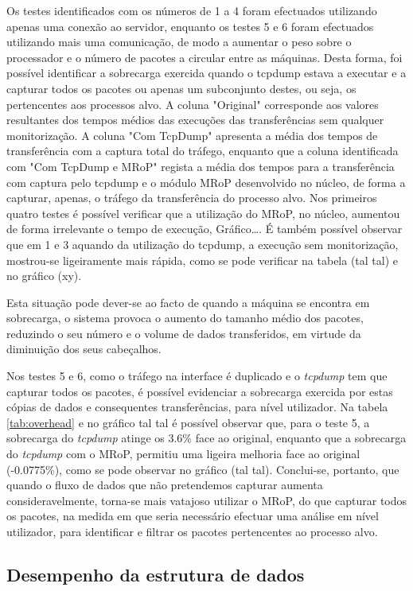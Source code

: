 Os testes identificados com os números de 1 a 4 foram efectuados utilizando apenas uma conexão ao servidor, enquanto os testes 5 e 6 foram efectuados utilizando mais uma comunicação, de modo a aumentar o peso sobre o processador e o número de pacotes a circular entre as máquinas.
Desta forma, foi possível identificar a sobrecarga exercida quando o tcpdump estava a executar e a capturar todos os pacotes ou apenas um subconjunto destes, ou seja, os pertencentes aos processos alvo.
A coluna "Original" corresponde aos valores resultantes dos tempos médios das execuções das transferências sem qualquer monitorização.
A coluna "Com TcpDump" apresenta a média dos tempos de transferência com a captura total do tráfego, enquanto que a coluna identificada com "Com TcpDump e MRoP" regista a média dos tempos para a transferência com captura pelo tcpdump e o módulo MRoP desenvolvido no núcleo, de forma a capturar, apenas, o tráfego da transferência do processo alvo.
Nos primeiros quatro testes é possível verificar que a utilização do MRoP, no núcleo, aumentou de forma irrelevante o tempo de execução, Gráfico….
É também possível observar que em 1 e 3 aquando da utilização do tcpdump, a execução sem monitorização, mostrou-se ligeiramente mais rápida, como se pode verificar na tabela (tal tal) e no gráfico (xy).


Esta situação pode dever-se ao facto de quando a máquina se encontra em sobrecarga, o sistema provoca o aumento do tamanho médio dos pacotes, reduzindo o seu número e o volume de dados transferidos, em virtude da diminuição dos seus cabeçalhos.

Nos testes 5 e 6, como o tráfego na interface é duplicado e o \textit{tcpdump} tem que capturar todos os pacotes, é possível evidenciar a sobrecarga exercida por estas cópias de dados e consequentes transferências, para nível utilizador.
Na tabela \ref{tab:overhead} e no gráfico tal tal é possível observar que, para o teste 5, a sobrecarga do \textit{tcpdump} atinge os 3.6\% face ao original, enquanto que a sobrecarga do \textit{tcpdump} com o MRoP, permitiu uma ligeira melhoria face ao original (-0.0775\%), como se pode observar no gráfico (tal tal).
Conclui-se, portanto, que quando o fluxo de dados que não pretendemos capturar aumenta consideravelmente, torna-se mais vatajoso utilizar o MRoP, do que capturar todos os pacotes, na medida em que seria necessário efectuar uma análise em nível utilizador, para identificar e filtrar os pacotes pertencentes ao processo alvo.

\subsection{Desempenho da estrutura de dados}

